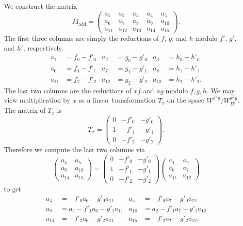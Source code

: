 We construct the matrix 
\[ M_{\text{add}} =
\begin{pmatrix}
  a_1 & a_2 & a_3 & a_4 & a_5 \\
  a_6 & a_7 & a_8 & a_9 & a_{10} \\
  a_{11} & a_{12} & a_{13} & a_{14} & a_{15}
\end{pmatrix}. \]
The first three columns are simply the reductions of $f$, $g$, and $h$ modulo $f'$, $g'$, and $h'$, respectively.
\begin{align*}
  a_1    &= f_0 - f'_0 & a_2    &= g_0 - g'_0 & a_3    &= h_0 - h'_0 \\
  a_6    &= f_1 - f'_1 & a_7    &= g_1 - g'_1 & a_8    &= h_1 - h'_1 \\
  a_{11} &= f_2 - f'_2 & a_{12} &= g_2 - g'_2 & a_{13} &= h_2 - h'_2.
\end{align*}
The last two columns are the reductions of $xf$ and $xg$ modulo $f,g,h$.
We may view multiplication by $x$ as a linear transformation $T_x$ on the space $W^{x^2y}/W_{D'}^{x^2y}$.
The matrix of $T_x$ is
\[ T_x = \begin{pmatrix}
    0 & -f'_0 & -g'_0 \\
    1 & -f'_1 & -g'_1 \\
    0 & -f'_2 & -g'_2
  \end{pmatrix}. \]
Therefore we compute the last two columns via
\[ 
  \begin{pmatrix}
    a_4    & a_5    \\
    a_9    & a_{10} \\
    a_{14} & a_{15}
  \end{pmatrix} = 
  \begin{pmatrix}
    0 & -f'_0 & -g'_0 \\
    1 & -f'_1 & -g'_1 \\
    0 & -f'_2 & -g'_2
  \end{pmatrix}
  \begin{pmatrix}
    a_1    & a_2    \\
    a_6    & a_7    \\
    a_{11} & a_{12}
  \end{pmatrix}
\]
to get
\begin{align*}
  a_4    &=     - f'_0a_6 - g'_0a_{11} & a_5    &=     - f'_0a_7 - g'_0a_{12} \\
  a_9    &= a_1 - f'_1a_6 - g'_1a_{11} & a_{10} &= a_2 - f'_1a_7 - g'_1a_{12} \\
  a_{14} &=     - f'_2a_6 - g'_2a_{11} & a_{15} &=     - f'_2a_7 - g'_2a_{12}.
\end{align*}


